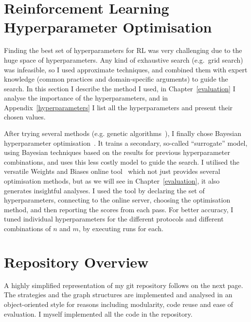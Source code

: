 \section{Reinforcement Learning Hyperparameter Optimisation}

Finding the best set of hyperparameters for RL was very challenging due to the huge space of hyperparameters. Any kind of exhaustive search (e.g.\ grid search) was infeasible, so I used approximate techniques, and combined them with expert knowledge (common practices and domain-specific arguments) to guide the search.
In this section I describe the method I used, in Chapter~\ref{evaluation} I analyse the importance of the hyperparameters, and in Appendix~\ref{hyperparameters} I list all the hyperparameters and present their chosen values.


After trying several methods (e.g. genetic algorithms~\cite{wicaksono2018genetichyper}), I finally chose Bayesian hyperparameter optimisation~\cite{eggensperger2013bayesianhyper}. It trains a secondary, so-called ``surrogate'' model, using Bayesian techniques based on the results for previous hyperparameter combinations, and uses this less costly model to guide the search. I utilised the versatile Weights and Biases online tool~\cite{biewald2020wandb} which not just provides several optimisation methods, but as we will see in Chapter~\ref{evaluation}, it also generates insightful analyses. I used the tool by declaring the set of hyperparameters, connecting to the online server, choosing the optimisation method, and then reporting the scores from each pass. For better accuracy, I tuned individual hyperparameters for the different protocols and different combinations of $n$ and $m$, by executing \NumberofHyperparameterIterations runs for each.


\section{Repository Overview} \label{repository-overview}

A highly simplified representation of my git repository follows on the next page. The strategies and the graph structures are implemented and analysed in an object-oriented style for reasons including modularity, code reuse and ease of evaluation. I myself implemented all the code in the repository.

\pagebreak

